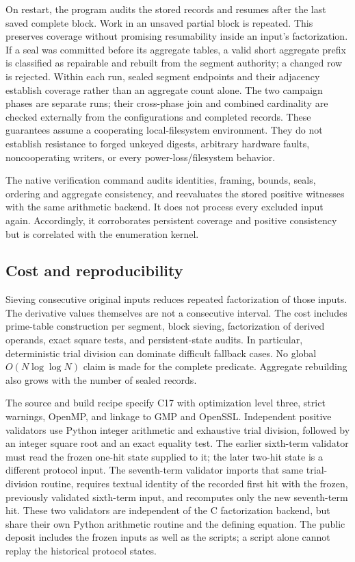 \documentclass[11pt,a4paper]{article}
\theoremstyle{remark}
\begin{document}
On restart, the program audits the stored records and resumes after the last
saved complete block. Work in an unsaved partial block is repeated. This
preserves coverage without promising resumability inside an input's
factorization. If a seal was committed before its aggregate tables, a valid
short aggregate prefix is classified as repairable and rebuilt from the
segment authority; a changed row is rejected. Within each run, sealed segment
endpoints and their adjacency establish coverage rather than an aggregate
count alone. The two campaign phases are separate runs; their cross-phase
join and combined cardinality are checked externally from the configurations
and completed records. These guarantees assume a cooperating local-filesystem environment.
They do not establish resistance to forged unkeyed digests, arbitrary hardware
faults, noncooperating writers, or every power-loss/filesystem behavior.

The native verification command audits identities, framing, bounds, seals,
ordering and aggregate consistency, and reevaluates the stored positive
witnesses with the same arithmetic backend. It does not process every
excluded input again. Accordingly, it corroborates persistent coverage and
positive consistency but is correlated with the enumeration kernel.

\subsection{Cost and reproducibility}
Sieving consecutive original inputs reduces repeated factorization of those
inputs. The derivative values themselves are not a consecutive interval.
The cost includes prime-table construction per segment, block sieving,
factorization of derived operands, exact square tests, and persistent-state
audits. In particular, deterministic trial division can dominate difficult
fallback cases. No global $O(N\log\log N)$ claim is made for the complete
predicate. Aggregate rebuilding also grows with the number of sealed records.

The source and build recipe specify C17 with optimization level three,
strict warnings, OpenMP, and linkage to GMP and OpenSSL. Independent positive
validators use Python integer arithmetic and exhaustive trial division,
followed by an integer square root and an exact equality test. The earlier
sixth-term validator must read the frozen one-hit state supplied to it;
the later two-hit state is a different protocol input. The seventh-term
validator imports that same trial-division routine, requires textual identity
of the recorded first hit with the frozen, previously validated sixth-term
input, and recomputes only the new seventh-term hit. These two validators are
independent of the C factorization backend, but share their own Python
arithmetic routine and the defining equation. The public deposit includes
the frozen inputs as well as the scripts; a script alone cannot replay
the historical protocol states.
\end{document}
